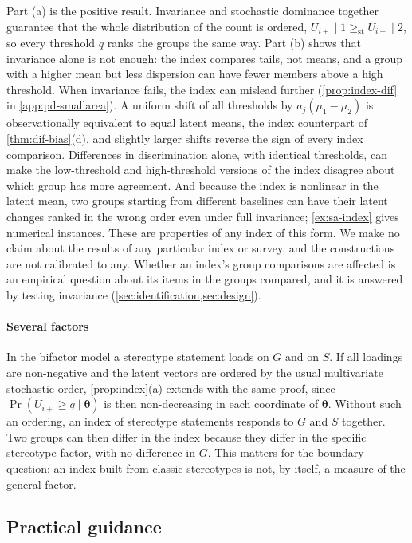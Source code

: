 Part (a) is the positive result. Invariance and stochastic dominance together guarantee that the whole distribution of the count is ordered, $U_{i+}\mid1\ge_{\mathrm{st}}U_{i+}\mid2$, so every threshold $q$ ranks the groups the same way. Part (b) shows that invariance alone is not enough: the index compares tails, not means, and a group with a higher mean but less dispersion can have fewer members above a high threshold. When invariance fails, the index can mislead further (\cref{prop:index-dif} in \cref{app:pd-smallarea}). A uniform shift of all thresholds by $a_j(\mu_1-\mu_2)$ is observationally equivalent to equal latent means, the index counterpart of \cref{thm:dif-bias}(d), and slightly larger shifts reverse the sign of every index comparison. Differences in discrimination alone, with identical thresholds, can make the low-threshold and high-threshold versions of the index disagree about which group has more agreement. And because the index is nonlinear in the latent mean, two groups starting from different baselines can have their latent changes ranked in the wrong order even under full invariance; \cref{ex:sa-index} gives numerical instances. These are properties of any index of this form. We make no claim about the results of any particular index or survey, and the constructions are not calibrated to any. Whether an index's group comparisons are affected is an empirical question about its items in the groups compared, and it is answered by testing invariance (\cref{sec:identification,sec:design}).

\paragraph{Several factors}
In the bifactor model a stereotype statement loads on $G$ and on $S$. If all loadings are non-negative and the latent vectors are ordered by the usual multivariate stochastic order, \cref{prop:index}(a) extends with the same proof, since $\Pr(U_{i+}\ge q\mid\bm\theta)$ is then non-decreasing in each coordinate of $\bm\theta$. Without such an ordering, an index of stereotype statements responds to $G$ and $S$ together. Two groups can then differ in the index because they differ in the specific stereotype factor, with no difference in $G$. This matters for the boundary question: an index built from classic stereotypes is not, by itself, a measure of the general factor.

\subsection{Practical guidance}\label{sec:sa-guidance}

